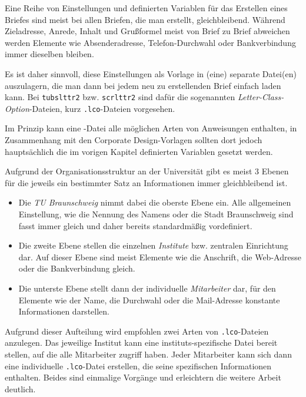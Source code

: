 Eine Reihe von Einstellungen und definierten Variablen für das Erstellen eines
Briefes sind meist bei allen Briefen, die man erstellt, gleichbleibend.
Während Zieladresse, Anrede, Inhalt und Grußformel meist von Brief zu Brief
abweichen werden Elemente wie Absenderadresse, Telefon-Durchwahl oder
Bankverbindung immer dieselben bleiben.

Es ist daher sinnvoll, diese Einstellungen als Vorlage in (eine) separate Datei(en)
auszulagern, die man dann bei jedem neu zu erstellenden Brief einfach laden
kann. Bei \texttt{tubslttr2} bzw. \texttt{scrlttr2} sind dafür die sogenannten
\emph{Letter-Class-Option}-Dateien, kurz \texttt{.lco}-Dateien vorgesehen.

Im Prinzip kann eine -Datei alle möglichen Arten von Anweisungen
enthalten, in Zusammenhang mit den Corporate Design-Vorlagen sollten dort jedoch
hauptsächlich die im vorigen Kapitel definierten Variablen gesetzt werden.

Aufgrund der Organisationsstruktur an der Universität gibt es meist 3 Ebenen für
die jeweils ein bestimmter Satz an Informationen immer gleichbleibend ist.

\begin{itemize}
  \item Die \emph{TU Braunschweig} nimmt dabei die oberste Ebene ein.
    Alle allgemeinen Einstellung, wie die Nennung des Namens oder die Stadt Braunschweig sind
    fasst immer gleich und daher bereits standardmäßig vordefiniert.

  \item Die zweite Ebene stellen die einzelnen \emph{Institute} bzw.
    zentralen Einrichtung dar. Auf dieser Ebene sind meist Elemente wie die
    Anschrift, die Web-Adresse oder die Bankverbindung gleich.

  \item Die unterste Ebene stellt dann der individuelle \emph{Mitarbeiter} dar,
    für den Elemente wie der Name, die Durchwahl oder die Mail-Adresse konstante
    Informationen darstellen.
\end{itemize}

Aufgrund dieser Aufteilung wird empfohlen zwei Arten von \texttt{.lco}-Dateien
anzulegen. Das jeweilige Institut kann eine instituts-spezifische Datei
bereit stellen, auf die alle Mitarbeiter zugriff haben. Jeder Mitarbeiter kann
sich dann eine individuelle \texttt{.lco}-Datei erstellen, die seine spezifischen
Informationen enthalten. Beides sind einmalige Vorgänge und erleichtern die
weitere Arbeit deutlich.

